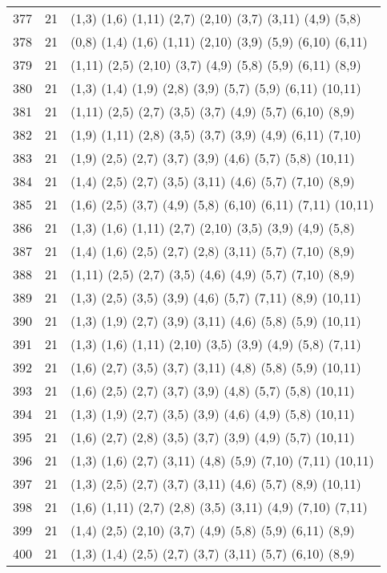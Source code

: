 {\begin{longtable}{lll}
377 & 21 & (1,3) (1,6) (1,11) (2,7) (2,10) (3,7) (3,11) (4,9) (5,8) \\
378 & 21 & (0,8) (1,4) (1,6) (1,11) (2,10) (3,9) (5,9) (6,10) (6,11) \\
379 & 21 & (1,11) (2,5) (2,10) (3,7) (4,9) (5,8) (5,9) (6,11) (8,9) \\
380 & 21 & (1,3) (1,4) (1,9) (2,8) (3,9) (5,7) (5,9) (6,11) (10,11) \\
381 & 21 & (1,11) (2,5) (2,7) (3,5) (3,7) (4,9) (5,7) (6,10) (8,9) \\
382 & 21 & (1,9) (1,11) (2,8) (3,5) (3,7) (3,9) (4,9) (6,11) (7,10) \\
383 & 21 & (1,9) (2,5) (2,7) (3,7) (3,9) (4,6) (5,7) (5,8) (10,11) \\
384 & 21 & (1,4) (2,5) (2,7) (3,5) (3,11) (4,6) (5,7) (7,10) (8,9) \\
385 & 21 & (1,6) (2,5) (3,7) (4,9) (5,8) (6,10) (6,11) (7,11) (10,11) \\
386 & 21 & (1,3) (1,6) (1,11) (2,7) (2,10) (3,5) (3,9) (4,9) (5,8) \\
387 & 21 & (1,4) (1,6) (2,5) (2,7) (2,8) (3,11) (5,7) (7,10) (8,9) \\
388 & 21 & (1,11) (2,5) (2,7) (3,5) (4,6) (4,9) (5,7) (7,10) (8,9) \\
389 & 21 & (1,3) (2,5) (3,5) (3,9) (4,6) (5,7) (7,11) (8,9) (10,11) \\
390 & 21 & (1,3) (1,9) (2,7) (3,9) (3,11) (4,6) (5,8) (5,9) (10,11) \\
391 & 21 & (1,3) (1,6) (1,11) (2,10) (3,5) (3,9) (4,9) (5,8) (7,11) \\
392 & 21 & (1,6) (2,7) (3,5) (3,7) (3,11) (4,8) (5,8) (5,9) (10,11) \\
393 & 21 & (1,6) (2,5) (2,7) (3,7) (3,9) (4,8) (5,7) (5,8) (10,11) \\
394 & 21 & (1,3) (1,9) (2,7) (3,5) (3,9) (4,6) (4,9) (5,8) (10,11) \\
395 & 21 & (1,6) (2,7) (2,8) (3,5) (3,7) (3,9) (4,9) (5,7) (10,11) \\
396 & 21 & (1,3) (1,6) (2,7) (3,11) (4,8) (5,9) (7,10) (7,11) (10,11) \\
397 & 21 & (1,3) (2,5) (2,7) (3,7) (3,11) (4,6) (5,7) (8,9) (10,11) \\
398 & 21 & (1,6) (1,11) (2,7) (2,8) (3,5) (3,11) (4,9) (7,10) (7,11) \\
399 & 21 & (1,4) (2,5) (2,10) (3,7) (4,9) (5,8) (5,9) (6,11) (8,9) \\
400 & 21 & (1,3) (1,4) (2,5) (2,7) (3,7) (3,11) (5,7) (6,10) (8,9) \\

\end{longtable}}
